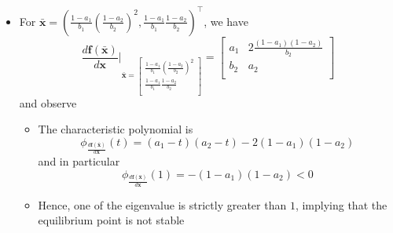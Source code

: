 \documentclass[12pt,a4paper]{article}
\begin{document}
\begin{itemize}
\begin{itemize}
  \item For $\bar{\bm{x}}=\left(\frac{1-a_{1}}{b_{1}}\left(\frac{1-a_{2}}{b_{2}}\right)^{2}, \frac{1-a_{1}}{b_{1}}\frac{1-a_{2}}{b_{2}}\right)^{\top}$, we have
    \begin{equation}\nonumber%
      \frac{d\bm{f}(\bar{\bm{x}})}{d\bm{x}}\Bigg|_{
        \bar{\bm{x}}=
        \begin{bmatrix}
          \frac{1-a_{1}}{b_{1}}\left(\frac{1-a_{2}}{b_{2}}\right)^{2} \\
          \frac{1-a_{1}}{b_{1}}\frac{1-a_{2}}{b_{2}} \\
        \end{bmatrix}
      }
      =
      \begin{bmatrix}
        a_{1} & 2\frac{(1-a_{1})(1-a_{2})}{b_{2}} \\
        b_{2} & a_{2} \\
      \end{bmatrix}
    \end{equation}
    and observe
    \begin{itemize}
    \item The characteristic polynomial is
      \begin{equation}\nonumber%
        \phi_{\frac{d\bm{f}(\bar{\bm{x}})}{d\bm{x}}}(t)
        = (a_{1}-t)(a_{2}-t) - 2(1-a_{1})(1-a_{2})
      \end{equation}
      and in particular
      \begin{equation}\nonumber%
        \phi_{\frac{d\bm{f}(\bar{\bm{x}})}{d\bm{x}}}(1)
        = -(1-a_{1})(1-a_{2}) < 0
      \end{equation}
    \item Hence, one of the eigenvalue is strictly greater than $1$,
      implying that the equilibrium point is not stable
    \end{itemize}

  \end{itemize}

\end{itemize}
\end{document}

